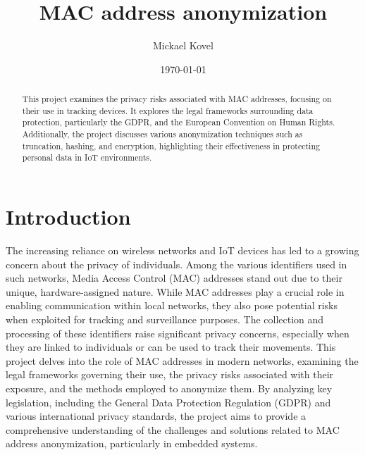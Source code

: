 \documentclass[aps,prb,twocolumn,superscriptaddress,floatfix,longbibliography,nofootinbib]{revtex4-2}
\newcommand{\mytitle}{MAC address anonymization}
\begin{document}

\title{\mytitle}

\author{Mickael Kovel}

\date{\today}

\begin{abstract}
This project examines the privacy risks associated with MAC addresses, focusing
on their use in tracking devices. It explores the legal frameworks surrounding 
data protection, particularly the GDPR, and the European Convention on Human Rights. 
Additionally, the project discusses various anonymization techniques such as truncation,
hashing, and encryption, highlighting their effectiveness in protecting personal data in
IoT environments.

\end{abstract}

\maketitle
\tableofcontents
\section{\label{sec:Intro}Introduction}
The increasing reliance on wireless networks and IoT devices has led to a 
growing concern about the privacy of individuals. Among the various identifiers 
used in such networks, Media Access Control (MAC) addresses stand out due to their 
unique, hardware-assigned nature. While MAC addresses play a crucial role in enabling 
communication within local networks, they also pose potential risks when exploited for 
tracking and surveillance purposes. The collection and processing of these identifiers 
raise significant privacy concerns, especially when they are linked to individuals or 
can be used to track their movements. This project delves into the role of MAC addresses 
in modern networks, examining the legal frameworks governing their use, the privacy risks
associated with their exposure, and the methods employed to anonymize them. By analyzing 
key legislation, including the General Data Protection Regulation (GDPR) and various 
international privacy standards, the project aims to provide a comprehensive understanding 
of the challenges and solutions related to MAC address anonymization, particularly in 
embedded systems.
\end{document}
